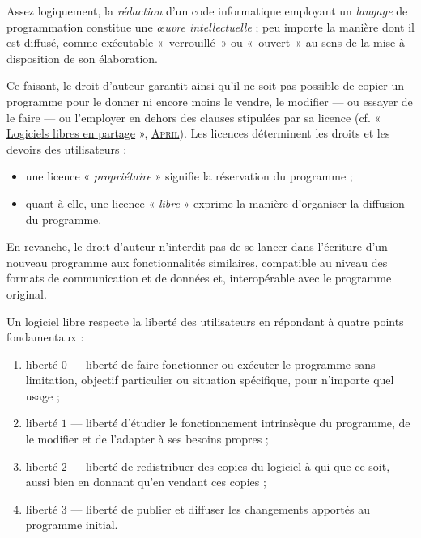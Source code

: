 Assez logiquement, la \emph{rédaction} d'un code informatique employant un \emph{langage} de programmation constitue une \emph{œuvre intellectuelle} ; peu importe la manière dont il est diffusé, comme exécutable «~verrouillé~» ou «~ouvert~» au sens de la mise à disposition de son élaboration.

Ce faisant, le droit d'auteur garantit ainsi qu'il ne soit pas possible de copier un programme pour le donner ni encore moins le vendre, le modifier --- ou essayer de le faire --- ou l'employer en dehors des clauses stipulées par sa licence (cf. « \href{./Documents/Chapter01/april-carrefour-numerique-2006-05-02.pdf}{Logiciels libres en partage} », \href{https://www.april.org/files/documents/20060502-carrefour-numerique.pdf}{\textsc{April}}).
Les licences déterminent les droits et les devoirs des utilisateurs :
\begin{itemize}
	\item une licence « \emph{propriétaire} » signifie la réservation du programme ;
	\item quant à elle, une licence « \emph{libre} » exprime la manière d'organiser la diffusion du programme.
\end{itemize}

En revanche, le droit d'auteur n'interdit pas de se lancer dans l'écriture d'un nouveau programme aux fonctionnalités similaires, compatible au niveau des formats de communication et de données et, interopérable avec le programme original.

Un logiciel libre respecte la liberté des utilisateurs en répondant à quatre points fondamentaux :
\begin{enumerate}
	\item liberté $0$ --- liberté de faire fonctionner ou exécuter le programme sans limitation, objectif particulier ou situation spécifique, pour n'importe quel usage ;
	\item liberté $1$ --- liberté d'étudier le fonctionnement intrinsèque du programme, de le modifier et de l'adapter à ses besoins propres ; 
	\item liberté $2$ --- liberté de redistribuer des copies du logiciel à qui que ce soit, aussi bien en donnant qu'en vendant ces copies ;
	\item liberté $3$ --- liberté de publier et diffuser les changements apportés au programme initial.
	\vspace*{0.5ex}
\end{enumerate}

